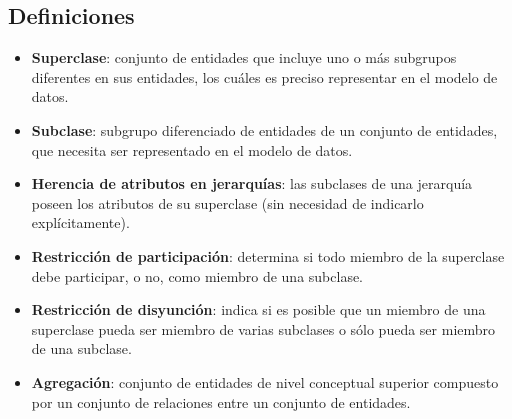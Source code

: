 \documentclass{article}
\begin{document}
\subsection{Definiciones}
\begin{itemize}
    \item \textbf{Superclase}: conjunto de entidades que incluye uno o más subgrupos diferentes en sus entidades, los cuáles es preciso representar en el modelo de datos.

    \item \textbf{Subclase}: subgrupo diferenciado de entidades de un conjunto de entidades, que necesita ser representado en el modelo de datos.

    \item \textbf{Herencia de atributos en jerarquías}: las subclases de una jerarquía poseen los atributos de su superclase (sin necesidad de indicarlo explícitamente).

    \item \textbf{Restricción de participación}: determina si todo miembro de la superclase debe participar, o no, como miembro de una subclase. 

    \item \textbf{Restricción de disyunción}: indica si es posible que un miembro de una superclase pueda ser miembro de varias subclases o sólo pueda ser miembro de una subclase.

    \item \textbf{Agregación}: conjunto de entidades de nivel conceptual superior compuesto por un conjunto de relaciones entre un conjunto de entidades. 
\end{itemize}
\end{document}
